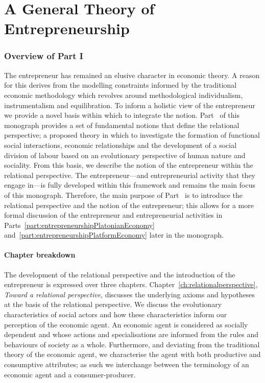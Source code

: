 \part{A General Theory of Entrepreneurship} 
\label{part:generalTheoryEntrepreneurship}

\section*{Overview of Part I}

The entrepreneur has remained an elusive character in economic theory. A reason for this derives from the modelling constraints informed by the traditional economic methodology which revolves around methodological individualism, instrumentalism and equilibration. To inform a holistic view of the entrepreneur we provide a novel basis within which to integrate the notion. Part~\ref{part:generalTheoryEntrepreneurship} of this monograph provides a set of fundamental notions that define the relational perspective; a proposed theory in which to investigate the formation of functional social interactions, economic relationships and the development of a social division of labour based on an evolutionary perspective of human nature and sociality. From this basis, we describe the notion of the entrepreneur within the relational perspective. The entrepreneur---and entrepreneurial activity that they engage in---is fully developed within this framework and remains the main focus of this monograph. Therefore, the main purpose of Part~\ref{part:generalTheoryEntrepreneurship} is to introduce the relational perspective and the notion of the entrepreneur; this allows for a more formal discussion of the entrepreneur and entrepreneurial activities in Parts~\ref{part:entrepreneurshipPlatonianEconomy} and~\ref{part:entrepreneurshipPlatformEconomy} later in the monograph.

\subsection*{Chapter breakdown}

The development of the relational perspective and the introduction of the entrepreneur is expressed over three chapters. Chapter~\ref{ch:relationalperspective}, \emph{Toward a relational perspective}, discusses the underlying axioms and hypotheses at the basis of the relational perspective. We discuss the evolutionary characteristics of social actors and how these characteristics inform our perception of the economic agent. An economic agent is considered as socially dependent and whose actions and specialisations are informed from the rules and behaviours of society as a whole. Furthermore, and deviating from the traditional theory of the economic agent, we characterise the agent with both productive and consumptive attributes; as such we interchange between the terminology of an economic agent and a consumer-producer.


